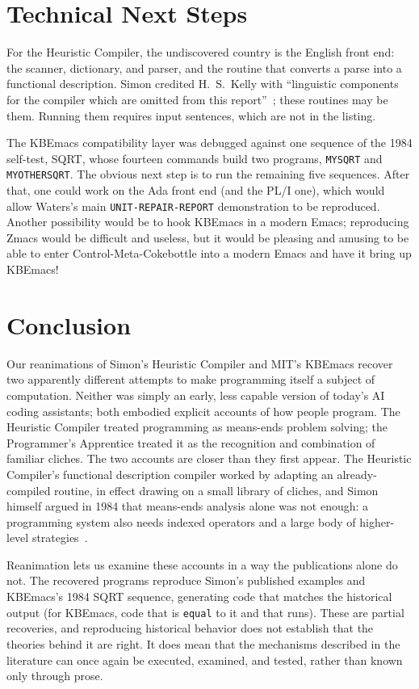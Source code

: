 \documentclass[11pt]{article}
\begin{document}
\section{Technical Next Steps}
\label{sec:next}

For the Heuristic Compiler, the undiscovered country is the English
front end: the scanner, dictionary, and parser, and the routine that
converts a parse into a functional description. Simon credited
H.~S.~Kelly with ``linguistic components for the compiler which are
omitted from this report''~\cite[p.~506]{simon1963jacm}; these
routines may be them. Running them requires input sentences, which are
not in the listing.

The KBEmacs compatibility layer was debugged against one sequence of
the 1984 self-test, SQRT, whose fourteen commands build two programs,
\texttt{MYSQRT} and \texttt{MYOTHERSQRT}. The obvious next step is to
run the remaining five sequences. After that, one could work on the
Ada front end (and the PL/I one), which would allow Waters's main
\texttt{UNIT-REPAIR-REPORT} demonstration to be reproduced. Another
possibility would be to hook KBEmacs in a modern Emacs; reproducing
Zmacs would be difficult and useless, but it would be pleasing and
amusing to be able to enter Control-Meta-Cokebottle into a modern
Emacs and have it bring up KBEmacs!

\section{Conclusion}
\label{sec:conc}

Our reanimations of Simon's Heuristic Compiler and MIT's KBEmacs
recover two apparently different attempts to make programming itself a
subject of computation. Neither was simply an early, less capable
version of today's AI coding assistants; both embodied explicit
accounts of how people program. The Heuristic Compiler treated
programming as means-ends problem solving; the Programmer's Apprentice
treated it as the recognition and combination of familiar cliches. The
two accounts are closer than they first appear. The Heuristic
Compiler's functional description compiler worked by adapting an
already-compiled routine, in effect drawing on a small library of
cliches, and Simon himself argued in 1984 that means-ends analysis
alone was not enough: a programming system also needs indexed
operators and a large body of higher-level
strategies~\cite{simon1986}.

Reanimation lets us examine these accounts in a way the publications
alone do not. The recovered programs reproduce Simon's published
examples and KBEmacs's 1984 SQRT sequence, generating code that
matches the historical output (for KBEmacs, code that is
\texttt{equal} to it and that runs). These are
partial recoveries, and reproducing historical behavior does not
establish that the theories behind it are right. It does mean that the
mechanisms described in the literature can once again be executed,
examined, and tested, rather than known only through prose.
\end{document}

